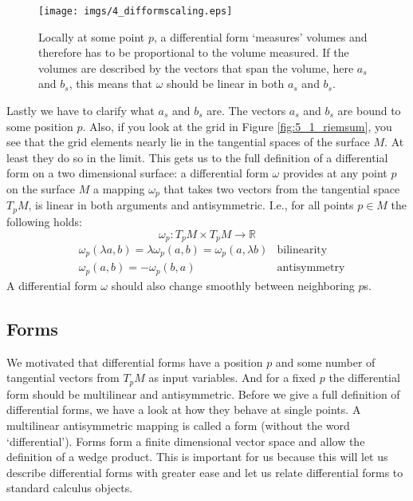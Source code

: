 \begin{figure}%
\begin{center}
	\texttt{[image: imgs/4\_difformscaling.eps]}%
\end{center}
\caption{Locally at some point $p$, a differential form `measures' volumes and therefore has to be proportional to the volume measured. If the volumes are described by the vectors that span the volume, here $a_s$ and $b_s$, this means that $\omega$ should be linear in both $a_s$ and $b_s$.}%
\label{fig:5_linear}%
\end{figure}

Lastly we have to clarify what $a_s$ and $b_s$ are. The vectors $a_s$ and $b_s$ are bound to some position $p$. Also, if you look at the grid in Figure \ref{fig:5_1_riemsum}, you see that the grid elements nearly lie in the tangential spaces of the surface $M$. At least they do so in the limit. This gets us to the full definition of a differential form on a two dimensional surface: a differential form $\omega$ provides at any point $p$ on the surface $M$ a mapping $\omega_p$ that takes two vectors from the tangential space $T_pM$, is linear in both arguments and antisymmetric. I.e., for all points $p \in M$ the following holds:
\[\omega_p: T_p M \times T_p M \to \mathbb R\]
\begin{align*}&\omega_p(\lambda a,b) = \lambda \omega_p(a,b) = \omega_p(a,\lambda b) &\text{bilinearity} \\
&\omega_p(a,b) = -\omega_p(b,a)  &\text{antisymmetry}\end{align*}
A differential form $\omega$ should also  change smoothly between neighboring $p$s.


\subsection{Forms}
\label{subsec::forms}
We motivated that differential forms have a position $p$ and some number of tangential vectors from $T_pM$ as input variables. And for a fixed $p$ the differential form should be multilinear and antisymmetric.  Before we give a full definition of differential forms, we have a look at how they behave at single points. A multilinear antisymmetric mapping is called a form (without the word `differential'). Forms form a finite dimensional vector space and allow the definition of a wedge product. This is important for us because this will let us describe differential forms with greater ease and let us relate differential forms to standard calculus objects.
